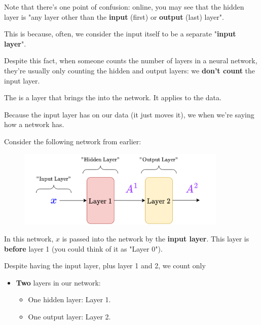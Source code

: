         Note that there's one point of confusion: online, you may see that the hidden layer is "any layer other than the \textbf{input} (first) or \textbf{output} (last) layer".

        This is because, often, we consider the input itself to be a separate "\textbf{input layer}". 
        
        Despite this fact, when someone counts the number of layers in a neural network, they're usually only counting the hidden and output layers: we \textbf{don't count} the input layer.
            \\

        \begin{definition}
            The  is a layer that brings the  into the network. It applies  to the data.

            Because the input layer has  on our data (it just moves it), we  when we're saying how  a network has.
        \end{definition}

        \miniex Consider the following network from earlier:

        \begin{figure}[H]
            \centering
            \includegraphics[width=100mm,scale=0.4]{images/nn_images/two_layers_input_layer.png}
        \end{figure}

        In this network, $x$ is passed into the network by the \textbf{input layer}. This layer is \textbf{before} layer 1 (you could think of it as "Layer 0").

        Despite having the input layer, plus layer 1 and 2, we count only
        
        \begin{itemize}
            \item \textbf{Two} layers in our network:
            \begin{itemize}
                \item One hidden layer: Layer 1.
                \item One output layer: Layer 2. 
            \end{itemize}
        \end{itemize}

        